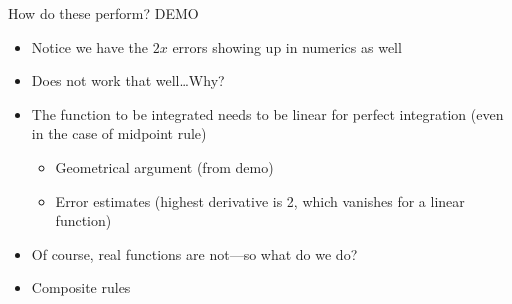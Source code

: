 \documentclass[presentation]{beamer}
\begin{document}
\begin{frame}[label={sec:org9c1f3f2}]{How do these perform?}
\alert{DEMO}
\begin{itemize}
\item Notice we have the \(2x\) errors showing up in numerics as well
\item Does not work that well\ldots{}Why?
\item The function to be integrated needs to be \alert{linear} for perfect integration
(even in the case of midpoint rule)
\begin{itemize}
\item Geometrical argument (from demo)
\item Error estimates (highest derivative is 2, which vanishes for a linear function)
\end{itemize}
\item Of course, real functions are not---so what do we do?
\item \alert{Composite rules}
\end{itemize}
\end{frame}
\end{document}
